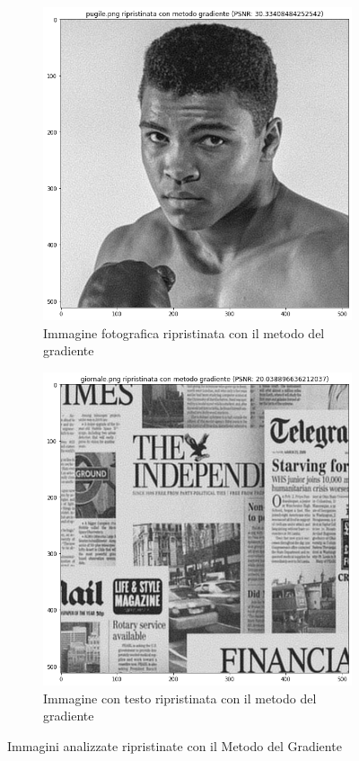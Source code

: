 \begin{figure}[H]
    \begin{subfigure}{0.5\textwidth}
        \centering
    \includegraphics[width=0.6\linewidth]{imgRel/fotogrmg.png}
    \caption{Immagine fotografica ripristinata con il metodo del gradiente}
    \label{fig:pugilegradiente}
    \end{subfigure}%
    \begin{subfigure}{0.5\textwidth}\centering
        \includegraphics[width=0.6\linewidth]{imgRel/giornalemg.png}
        \caption{Immagine con testo ripristinata con il metodo del gradiente}
    \end{subfigure}
\caption{Immagini analizzate ripristinate con il Metodo del Gradiente}
    \centering

\end{figure}
